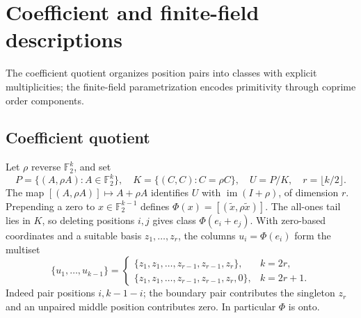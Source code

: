 \documentclass[11pt]{article}
\theoremstyle{definition}
\theoremstyle{remark}
\begin{document}
\appendix
\section{Coefficient and finite-field descriptions}\label{sec:classical-descriptions}
The coefficient quotient organizes position pairs into classes with explicit
multiplicities; the finite-field parametrization encodes primitivity
through coprime order components.

\subsection{Coefficient quotient}\label{sec:quotient}
Let $\rho$ reverse $\mathbb F_2^k$, and set
\[
 P=\{(A,\rho A):A\in\mathbb F_2^k\},\quad
 K=\{(C,C):C=\rho C\},\quad U=P/K,\quad r=\lfloor k/2\rfloor.
\]
The map $[(A,\rho A)]\mapsto A+\rho A$ identifies $U$ with
$\operatorname{im}(I+\rho)$, of dimension $r$.
Prepending a zero to $x\in\mathbb F_2^{k-1}$ defines
$\Phi(x)=[(\widetilde x,\rho\widetilde x)]$.
The all-ones tail lies in $K$, so deleting positions $i,j$ gives
class $\Phi(e_i+e_j)$. With zero-based coordinates and a suitable basis
$z_1,\ldots,z_r$, the columns $u_i=\Phi(e_i)$ form the multiset
\begin{equation}\label{eq:columns}
 \{u_1,\ldots,u_{k-1}\}=
 \begin{cases}
 \{z_1,z_1,\ldots,z_{r-1},z_{r-1},z_r\},&k=2r,\\
 \{z_1,z_1,\ldots,z_{r-1},z_{r-1},z_r,0\},&k=2r+1.
 \end{cases}
\end{equation}
Indeed pair positions $i,k-1-i$; the boundary pair contributes the
singleton $z_r$ and an unpaired middle position contributes zero.
In particular $\Phi$ is onto.
\end{document}
